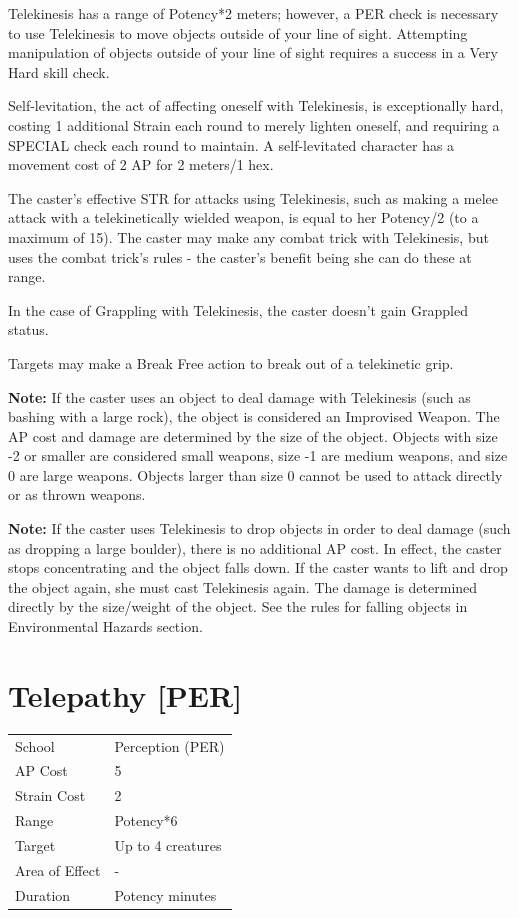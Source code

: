 \documentclass[11pt,a4paper,twocolumn]{book}
\begin{document}
Telekinesis has a range of Potency*2 meters; however, a PER check is necessary to use Telekinesis to move objects outside of your line of sight. Attempting manipulation of objects outside of your line of sight requires a success in a Very Hard skill check.

Self-levitation, the act of affecting oneself with Telekinesis, is exceptionally hard, costing 1 additional Strain each round to merely lighten oneself, and requiring a SPECIAL check each round to maintain. A self-levitated character has a movement cost of 2 AP for 2 meters/1 hex.

The caster's effective STR for attacks using Telekinesis, such as making a melee attack with a telekinetically wielded weapon, is equal to her Potency/2 (to a maximum of 15). The caster may make any combat trick with Telekinesis, but uses the combat trick's rules - the caster's benefit being she can do these at range.

In the case of Grappling with Telekinesis, the caster doesn't gain Grappled status.

Targets may make a Break Free action to break out of a telekinetic grip.

\textbf{Note:} If the caster uses an object to deal damage with Telekinesis (such as bashing with a large rock), the object is considered an Improvised Weapon. The AP cost and damage are determined by the size of the object. Objects with size -2 or smaller are considered small weapons, size -1 are medium weapons, and size 0 are large weapons. Objects larger than size 0 cannot be used to attack directly or as thrown weapons.

\textbf{Note:} If the caster uses Telekinesis to drop objects in order to deal damage (such as dropping a large boulder), there is no additional AP cost. In effect, the caster stops concentrating and the object falls down. If the caster wants to lift and drop the object again, she must cast Telekinesis again. The damage is determined directly by the size/weight of the object. See the rules for falling objects in Environmental Hazards section.


\section*{Telepathy [PER]}
{
	\begin{tabu} to 75mm{| X[l,4] | X[l,7] |}
		\hline
		School 			& Perception (PER) 				\\
        AP Cost	      	& 5								\\
        Strain Cost     & 2 							\\
        Range     		& Potency*6 					\\
        Target      	& Up to 4 creatures				\\
        Area of Effect  & - 	 						\\
        Duration     	& Potency minutes				\\ \hline
	\end{tabu}
		
}
\end{document}
